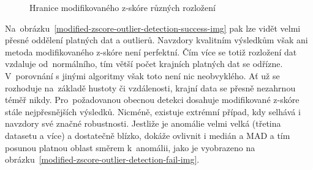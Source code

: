 \begin{figure}[!hbt]
    \centering
    \qquad
    \caption{Hranice modifikovaného z-skóre různých rozložení}
    \label{z-score-param-img}
\end{figure}

Na~obrázku~\ref{modified-zscore-outlier-detection-success-img} pak lze vidět velmi přesné oddělení platných dat a outlierů. Navzdory kvalitním výsledkům však ani metoda modifikovaného z-skóre není perfektní. Čím více se totiž rozložení dat vzdaluje od~normálního, tím větší počet krajních platných dat se odřízne. V~porovnání s jinými algoritmy však toto není nic neobvyklého. Ať už se rozhoduje na~základě hustoty či vzdálenosti, krajní data se přesně nezahrnou téměř nikdy. Pro~požadovanou obecnou detekci dosahuje modifikované z-skóre stále nejpřesnějších výsledků. Nicméně, existuje extrémní případ, kdy selhává i navzdory své značné robustnosti. Jestliže je anomálie velmi velká (třetina datasetu a více) a dostatečně blízko, dokáže ovlivnit i medián a MAD a tím posunou platnou oblast směrem k~anomálii, jako je vyobrazeno na obrázku~\ref{modified-zscore-outlier-detection-fail-img}.

